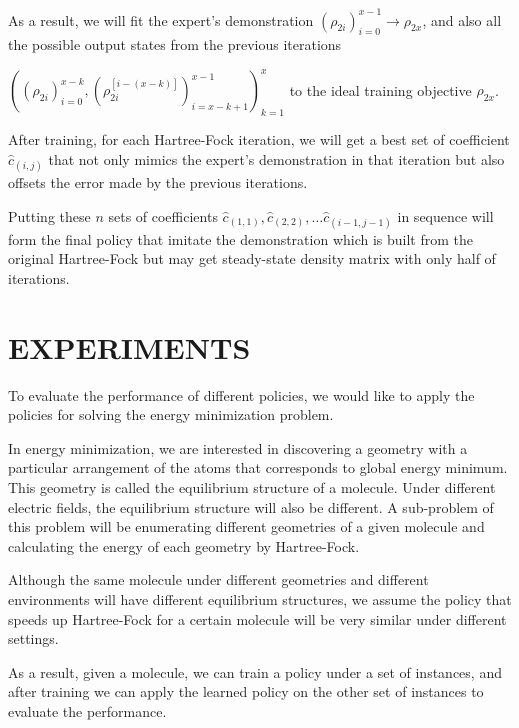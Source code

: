 \documentclass[twoside]{article}
\begin{document}
As a result, we will fit the expert's demonstration $(\rho_{2i})_{i=0}^{x-1} \rightarrow \rho_{2x}$, and also all the possible output states from the previous iterations 

$((\rho_{2i})_{i=0}^{x-k} ,(\rho_{2i}^{[i-(x-k)]})^{x-1}_{i=x-k+1})_{k=1}^{x}$  
to the ideal training objective $\rho_{2x}$.
%

After training, for each Hartree-Fock iteration, we will get a best set of coefficient $\hat{c}_{(i,j)}$ that not only mimics the expert's demonstration in that iteration but also offsets the error made by the previous iterations.

% 
Putting these $n$ sets of coefficients $\hat{c}_{(1,1)}, \hat{c}_{(2,2)}, \ldots  \hat{c}_{(i-1,j-1)}$ in sequence will form the final policy that imitate the demonstration which is built from  the original Hartree-Fock but may get steady-state density matrix with only half of iterations. 



\section{EXPERIMENTS}

To evaluate the performance of different policies, we would like to apply the policies for solving the energy minimization problem.

In energy minimization, we are interested in discovering a geometry with a particular arrangement of the atoms that corresponds to global energy minimum. This geometry is called the equilibrium structure of a molecule. Under different electric fields, the equilibrium structure will also be different. A sub-problem of this problem will be enumerating different geometries of a given molecule and calculating the energy of each geometry by Hartree-Fock. 

 
Although the same molecule under different geometries and different environments will have different equilibrium structures, we assume the policy that speeds up Hartree-Fock for a certain molecule will be very similar under different settings. 

As a result, given a molecule, we can train a policy under a set of instances, and after training we can apply the learned policy on the other set of instances to evaluate the performance. 
 
\end{document}
